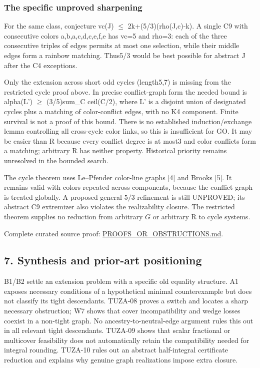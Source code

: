 \documentclass[11pt]{article}
\begin{document}
\subsubsection{The specific unproved sharpening}\label{the-specific-unproved-sharpening}

For the same class, conjecture vc(J) \(\le\) 2k+(5/3)(rho(J,c)-k). A single C9 with consecutive colors a,b,a,c,d,c,e,f,e has vc=5 and rho=3: each of the three consecutive triples of edges permits at most one selection, while their middle edges form a rainbow matching. Thus5/3 would be best possible for abstract J after the C4 exceptions.

Only the extension across short odd cycles (length5,7) is missing from the restricted cycle proof above. In precise conflict-graph form the needed bound is alpha(L') \(\ge\) (3/5)sum\_C ceil(\textbar C\textbar/2), where L' is a disjoint union of designated cycles plus a matching of color-conflict edges, with no K4 component. Finite survival is not a proof of this bound. There is no established induction/exchange lemma controlling all cross-cycle color links, so this is insufficient for GO. It may be easier than R because every conflict degree is at most3 and color conflicts form a matching; arbitrary R has neither property. Historical priority remains unresolved in the bounded search.

The cycle theorem uses Le--Pfender color-line graphs {[}4{]} and Brooks {[}5{]}. It remains valid with colors repeated across components, because the conflict graph is treated globally. A proposed general \(5/3\) refinement is still UNPROVED; its abstract C9 extremizer also violates the realizability closure. The restricted theorem supplies no reduction from arbitrary \(G\) or arbitrary R to cycle systems.

Complete curated source proof: \href{https://github.com/pappa211/ai-math-experiments/blob/main/problems/TUZA-10/notes/PROOFS_OR_OBSTRUCTIONS.md}{PROOFS\_OR\_OBSTRUCTIONS.md}.

\subsection{7. Synthesis and prior-art positioning}\label{synthesis-and-prior-art-positioning}

B1/B2 settle an extension problem with a specific old equality structure. A1 exposes necessary conditions of a hypothetical minimal counterexample but does not classify its tight descendants. TUZA-08 proves a switch and locates a sharp necessary obstruction; W7 shows that cover incompatibility and wedge losses coexist in a non-tight graph. No ancestry-to-neutral-edge argument rules this out in all relevant tight descendants. TUZA-09 shows that scalar fractional or multicover feasibility does not automatically retain the compatibility needed for integral rounding. TUZA-10 rules out an abstract half-integral certificate reduction and explains why genuine graph realizations impose extra closure.
\end{document}
